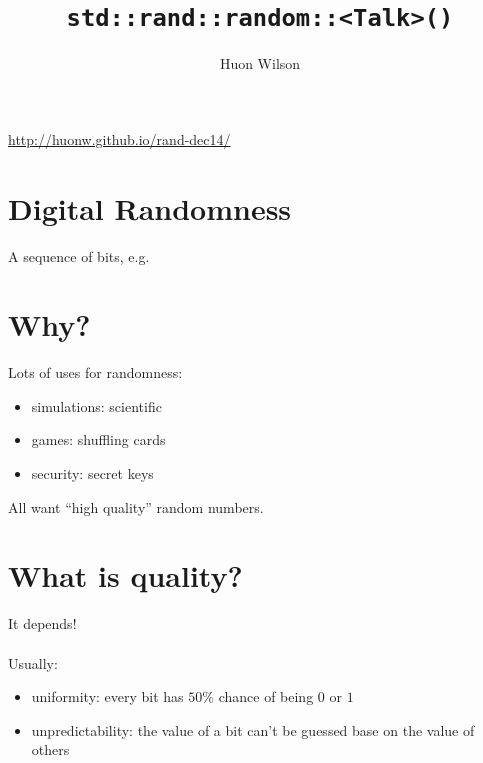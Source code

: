 \documentclass[14pt]{beamer}
\author{Huon Wilson}
\title{\texttt{std::rand::random::<Talk>()}}
\begin{document}
\begin{frame}
  \maketitle
  \begin{center}
    \url{http://huonw.github.io/rand-dec14/}
  \end{center}
\end{frame}

\section{Digital Randomness}
\begin{frame}
A sequence of bits, e.g.


\end{frame}

\section{Why?}
\begin{frame}
  Lots of uses for randomness:
  \begin{itemize}
  \item simulations: scientific
  \item games: shuffling cards
  \item security: secret keys
  \end{itemize}

  All want ``high quality'' random numbers.
\end{frame}

\section{What is quality?}
\begin{frame}
  It depends!\\~\\

  Usually:

  \begin{itemize}
  \item uniformity: every bit has $50\%$ chance of being $0$ or $1$
  \item unpredictability: the value of a bit can't be guessed base
    on the value of others
  \end{itemize}
\end{frame}
\end{document}
